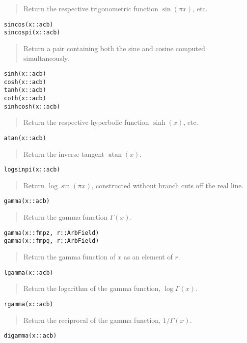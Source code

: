 \documentclass[a4paper,10pt]{article}
\newcommand{\desc}[1]{\vspace{-3mm}\begin{quote}#1\end{quote}}
\begin{document}
{{\desc{Return the respective trigonometric function $\sin(\pi x)$, etc.}

\begin{lstlisting}
sincos(x::acb)
sincospi(x::acb)
\end{lstlisting}

\desc{Return a pair containing both the sine and cosine computed simultaneously.}

\begin{lstlisting}
sinh(x::acb)
cosh(x::acb)
tanh(x::acb)
coth(x::acb)
sinhcosh(x::acb)
\end{lstlisting}

\desc{Return the respective hyperbolic function $\sinh(x)$, etc.}

\begin{lstlisting}
atan(x::acb)
\end{lstlisting}

\desc{Return the inverse tangent $\operatorname{atan}(x)$.}

\begin{lstlisting}
logsinpi(x::acb)
\end{lstlisting}

\desc{Return $\log\sin(\pi x)$, constructed without branch cuts off the real line.}

\begin{lstlisting}
gamma(x::acb)
\end{lstlisting}

\desc{Return the gamma function $\Gamma(x)$.}

\begin{lstlisting}
gamma(x::fmpz, r::ArbField)
gamma(x::fmpq, r::ArbField)
\end{lstlisting}

\desc{Return the gamma function of $x$ as an element of $r$.}

\begin{lstlisting}
lgamma(x::acb)
\end{lstlisting}

\desc{Return the logarithm of the gamma function, $\log \Gamma(x)$.}

\begin{lstlisting}
rgamma(x::acb)
\end{lstlisting}

\desc{Return the reciprocal of the gamma function, $1 / \Gamma(x)$.}

\begin{lstlisting}
digamma(x::acb)
\end{lstlisting}

}}
\end{document}
